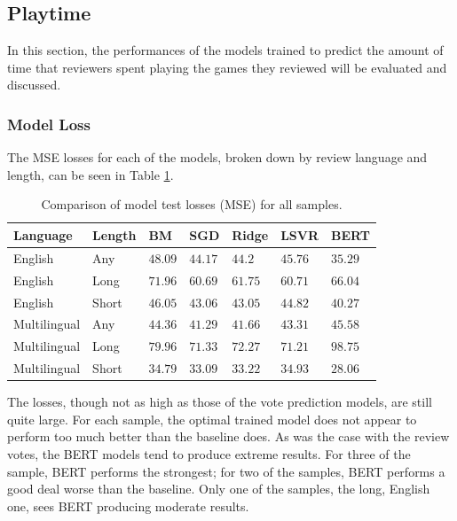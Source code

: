 \subsection{Playtime} \label{sec:Res_RF_PT}

In this section, the performances of the models trained to predict the amount of time that reviewers spent playing the games they reviewed will be evaluated and discussed.

\subsubsection{Model Loss}

The MSE losses for each of the models, broken down by review language and length, can be seen in Table \ref{tab:Res_RF_PT_CompLoss}.

\begin{table}[ht]
    \centering
    \begin{tabular}{l l | l l l l l}
        \toprule
        \textbf{Language} & \textbf{Length} & \textbf{BM} & \textbf{SGD} & \textbf{Ridge} & \textbf{LSVR} & \textbf{BERT}\\\midrule
        English&Any&$48.09$&$44.17$&$44.2$&$45.76$&$\mathbf{35.29}$\\
        English&Long&$71.96$&$\mathbf{60.69}$&$61.75$&$60.71$&$66.04$\\
        English&Short&$46.05$&$43.06$&$43.05$&$44.82$&$\mathbf{40.27}$\\\midrule
        Multilingual&Any&$44.36$&$\mathbf{41.29}$&$41.66$&$43.31$&$45.58$\\
        Multilingual&Long&$79.96$&$71.33$&$72.27$&$\mathbf{71.21}$&$98.75$\\
        Multilingual&Short&$34.79$&$33.09$&$33.22$&$34.93$&$\mathbf{28.06}$\\
        \bottomrule
    \end{tabular}
    \caption{Comparison of model test losses (MSE) for all samples.}
    \label{tab:Res_RF_PT_CompLoss}
\end{table}

The losses, though not as high as those of the vote prediction models, are still quite large. For each sample, the optimal trained model does not appear to perform too much better than the baseline does. As was the case with the review votes, the BERT models tend to produce extreme results. For three of the sample, BERT performs the strongest; for two of the samples, BERT performs a good deal worse than the baseline. Only one of the samples, the long, English one, sees BERT producing moderate results.


